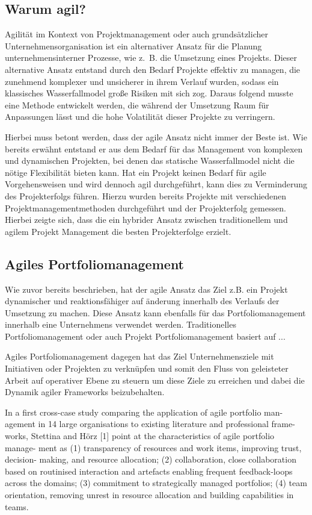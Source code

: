 \subsection{Warum agil?}
Agilität im Kontext von Projektmanagement oder auch grundsätzlicher Unternehmensorganisation ist ein alternativer Ansatz für die Planung unternehmensinterner Prozesse, wie z. B. die Umsetzung eines Projekts. Dieser alternative Ansatz entstand durch den Bedarf Projekte effektiv zu managen, die zunehmend komplexer und unsicherer in ihrem Verlauf wurden, sodass ein klassisches Wasserfallmodel große Risiken mit sich zog. Daraus folgend musste eine Methode entwickelt werden, die während der Umsetzung Raum für Anpassungen lässt und die hohe Volatilität dieser Projekte zu verringern. \cite{agilismVsTranditionalApproaches}

Hierbei muss betont werden, dass der agile Ansatz nicht immer der Beste ist. Wie bereits erwähnt entstand er aus dem Bedarf für das Management von komplexen und dynamischen Projekten, bei denen das statische Wasserfallmodel nicht die nötige Flexibilität bieten kann. Hat ein Projekt keinen Bedarf für agile Vorgehensweisen und wird dennoch agil durchgeführt, kann dies zu Verminderung des Projekterfolgs führen. Hierzu wurden bereits Projekte mit verschiedenen Projektmanagementmethoden durchgeführt und der Projekterfolg gemessen. Hierbei zeigte sich, dass die ein hybrider Ansatz zwischen traditionellem und agilem Projekt Management die besten Projekterfolge erzielt. \cite{traditionalAndAgileOnProjectSuccess}
\subsection{Agiles Portfoliomanagement}
Wie zuvor bereits beschrieben, hat der agile Ansatz das Ziel z.B. ein Projekt dynamischer und reaktionsfähiger auf änderung innerhalb des Verlaufs der Umsetzung zu machen. Diese Ansatz kann ebenfalls für das Portfoliomanagement innerhalb eine Unternehmens verwendet werden. Traditionelles Portfoliomanagement oder auch Projekt Portfoliomanagement basiert auf ... \cite{}

Agiles Portfoliomanagement dagegen hat das Ziel Unternehmensziele mit Initiativen oder Projekten zu verknüpfen und somit den Fluss von geleisteter Arbeit auf operativer Ebene zu steuern um diese Ziele zu erreichen und dabei die Dynamik agiler Frameworks beizubehalten. \cite{}

In a first cross-case study comparing the application of agile portfolio man- agement in 14 large organisations to existing literature and professional frame- works, Stettina and Hörz [1] point at the characteristics of agile portfolio manage- ment as (1) transparency of resources and work items, improving trust, decision- making, and resource allocation; (2) collaboration, close collaboration based on routinised interaction and artefacts enabling frequent feedback-loops across the domains; (3) commitment to strategically managed portfolios; (4) team orientation, removing unrest in resource allocation and building capabilities in teams.

